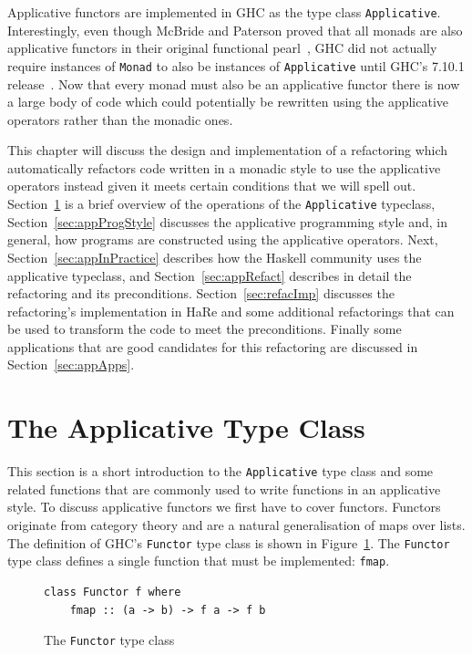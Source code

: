 Applicative functors are implemented in GHC as the type class \texttt{Applicative}. Interestingly, even though McBride and Paterson proved that all monads are also applicative functors in their original functional pearl~\citep{mcbrideIdioms}, GHC did not actually require instances of \texttt{Monad} to also be instances of \texttt{Applicative} until GHC's 7.10.1 release~\citep{ghc7.10Release}. Now that every monad must also be an applicative functor there is now a large body of code which could potentially be rewritten using the applicative operators rather than the monadic ones. 

This chapter will discuss the design and implementation of a refactoring which automatically refactors code written in a monadic style to use the applicative operators instead given it meets certain conditions that we will spell out. Section~\ref{sec:appOverview} is a brief overview of the operations of the \texttt{Applicative} typeclass, Section~\ref{sec:appProgStyle} discusses the applicative programming style and, in general, how programs are constructed using the applicative operators. Next, Section~\ref{sec:appInPractice} describes how the Haskell community uses the applicative typeclass, and Section~\ref{sec:appRefact} describes in detail the refactoring and its preconditions. Section~\ref{sec:refacImp} discusses the refactoring's implementation in HaRe and some additional refactorings that can be used to transform the code to meet the preconditions. Finally some applications that are good candidates for this refactoring are discussed in Section~\ref{sec:appApps}.

\section{The Applicative Type Class}
\label{sec:appOverview}
This section is a short introduction to the \texttt{Applicative} type class and some related functions that are commonly used to write functions in an applicative style. 
To discuss applicative functors we first have to cover functors. Functors originate from category theory and are a natural generalisation of maps over lists. The definition of GHC's \texttt{Functor} type class is shown in Figure~\ref{functor}. The \texttt{Functor} type class defines a single function that must be implemented: \texttt{fmap}.

\begin{figure}
\begin{lstlisting}
class Functor f where
	fmap :: (a -> b) -> f a -> f b
\end{lstlisting}
\caption{The \texttt{Functor} type class}
\label{functor}
\end{figure}

